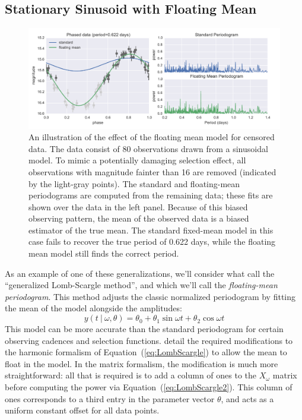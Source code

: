 \documentclass{emulateapj}
\newcommand{\figlabel}[1]{\label{fig:#1}}
\newcommand{\Eq}[1]{Equation~(\ref{eq:#1})}
\newcommand{\eq}[1]{\Eq{#1}}
\newcommand{\sectlabel}[1]{\label{sect:#1}}
\begin{document}
\subsection{Stationary Sinusoid with Floating Mean}
\sectlabel{floating_mean}

\begin{figure}
  \centering
  \includegraphics[width=\textwidth]{fig02.pdf}
  \caption{
    An illustration of the effect of the floating mean model for censored data.
    The data consist of 80 observations drawn from a sinusoidal model. To mimic a potentially damaging selection effect, all observations with magnitude fainter than 16 are removed (indicated by the light-gray points). The standard and floating-mean periodograms are computed from the remaining data; these fits are shown over the data in the left panel. Because of this biased observing pattern, the mean of the observed data is a biased estimator of the true mean. The standard fixed-mean model in this case fails to recover the true period of 0.622 days, while the floating mean model still finds the correct period.
  }
  \figlabel{floating_mean}
\end{figure}

As an example of one of these generalizations, we'll consider what \citet{Zechmeister09} call the ``generalized Lomb-Scargle method'', and which we'll call the {\it floating-mean periodogram}. This method adjusts the classic normalized periodogram by fitting the mean of the model alongside the amplitudes:
\begin{equation}
  y(t~|~\omega, \theta) = \theta_0 + \theta_1\sin\omega t + \theta_2\cos\omega t
\end{equation}
This model can be more accurate than the standard periodogram for certain observing cadences and selection functions. \citet{Zechmeister09} detail the required modifications to the harmonic formalism of \eq{LombScargle} to allow the mean to float in the model. In the matrix formalism, the modification is much more straightforward: all that is required is to add a column of ones to the $X_\omega$ matrix before computing the power via \eq{LombScargle2}. This column of ones corresponds to a third entry in the parameter vector $\theta$, and acts as a uniform constant offset for all data points.
\end{document}
